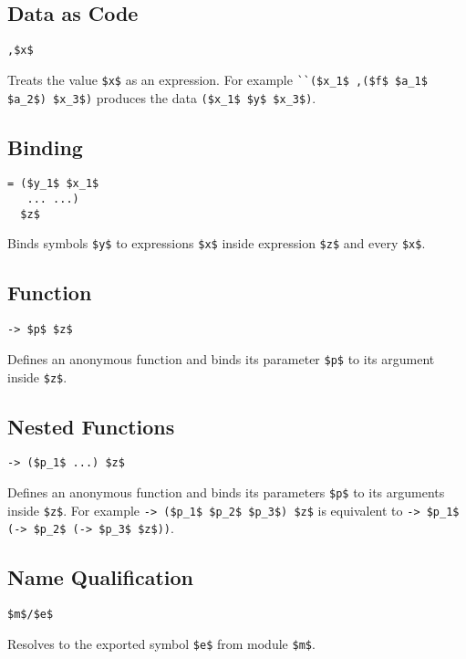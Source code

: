 \documentclass{article}
\begin{document}
\begin{multicols}
\bigskip\subsection*{Data as Code}
\begin{lstlisting}
,$x$
\end{lstlisting}
Treats the value \lstinline{$x$} as an expression.
For example \lstinline{``($x_1$ ,($f$ $a_1$ $a_2$) $x_3$)}
produces the data \lstinline{($x_1$ $y$ $x_3$)}.

\bigskip\subsection*{Binding}
\begin{lstlisting}
= ($y_1$ $x_1$
   ... ...)
  $z$
\end{lstlisting}
Binds symbols \lstinline{$y$} to expressions \lstinline{$x$}
inside expression \lstinline{$z$} and every \lstinline{$x$}.

\bigskip\subsection*{Function}
\begin{lstlisting}
-> $p$ $z$
\end{lstlisting}
Defines an anonymous function
and binds its parameter \lstinline{$p$} to its argument
inside \lstinline{$z$}.

\bigskip\subsection*{Nested Functions}
\begin{lstlisting}
-> ($p_1$ ...) $z$
\end{lstlisting}
Defines an anonymous function and
binds its parameters \lstinline{$p$} to its arguments inside \lstinline{$z$}.
For example \lstinline{-> ($p_1$ $p_2$ $p_3$) $z$}
is equivalent to \lstinline{-> $p_1$ (-> $p_2$ (-> $p_3$ $z$))}.

\bigskip\subsection*{Name Qualification}
\begin{lstlisting}
$m$/$e$
\end{lstlisting}
Resolves to the exported symbol \lstinline{$e$} from module \lstinline{$m$}.


\end{multicols}
\end{document}
